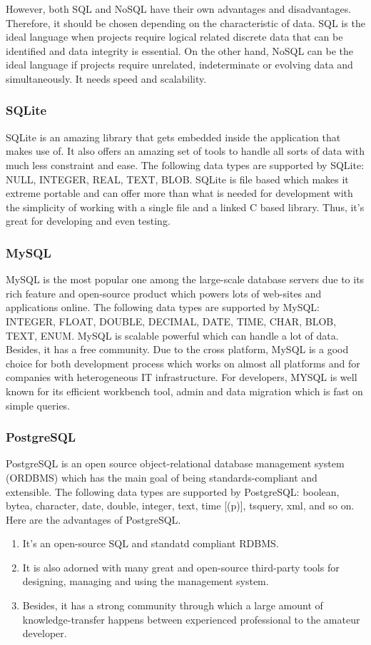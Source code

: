 However, both SQL and NoSQL have their own advantages and disadvantages.
Therefore, it should be chosen depending on the characteristic of data.
SQL is the ideal language when projects require logical related discrete data that can be identified and data integrity is essential.
On the other hand, NoSQL can be the ideal language if projects require unrelated, indeterminate or evolving data and simultaneously. 
It needs speed and scalability.



\subsubsection{SQLite}
SQLite is an amazing library that gets embedded inside the 
application that makes use of. It also offers an amazing 
set of tools to handle all sorts of data with much less 
constraint and ease. The following data types are supported 
by SQLite: NULL, INTEGER, REAL, TEXT, BLOB. SQLite is file
based which makes it extreme portable and can offer more than 
what is needed for development with the simplicity of working 
with a single file and a linked C based library. Thus, it's 
great for developing and even testing.

\subsubsection{MySQL}
MySQL is the most popular one among the large-scale database servers due to its rich feature and open-source product which powers lots of web-sites and applications online. 
The following data types are supported by MySQL: INTEGER, FLOAT, DOUBLE, DECIMAL, DATE, TIME, CHAR, BLOB, TEXT, ENUM. MySQL is scalable powerful which can handle a lot of data. 
Besides, it has a free community. 
Due to the cross platform, MySQL is a good choice for both development process which works on almost all platforms and for companies with heterogeneous IT infrastructure.
For developers, MYSQL is well known for its efficient workbench tool, admin and data migration which is fast on simple queries.

\subsubsection{PostgreSQL}
PostgreSQL is an open source object-relational database management system (ORDBMS) which has the main goal of being standards-compliant and extensible. 
The following data types are supported by PostgreSQL: boolean, bytea, character, date, double, integer, text, time [(p)], tsquery, xml, and so on. 
Here are the advantages of PostgreSQL.
\begin{enumerate}
	\item It's an open-source SQL and standatd compliant RDBMS. 
	\item It is also adorned with many great and open-source third-party tools for designing, managing and using the management system.
	\item Besides, it has a strong community through which a large amount of knowledge-transfer happens between experienced professional to the amateur developer.
\end{enumerate} 
 


